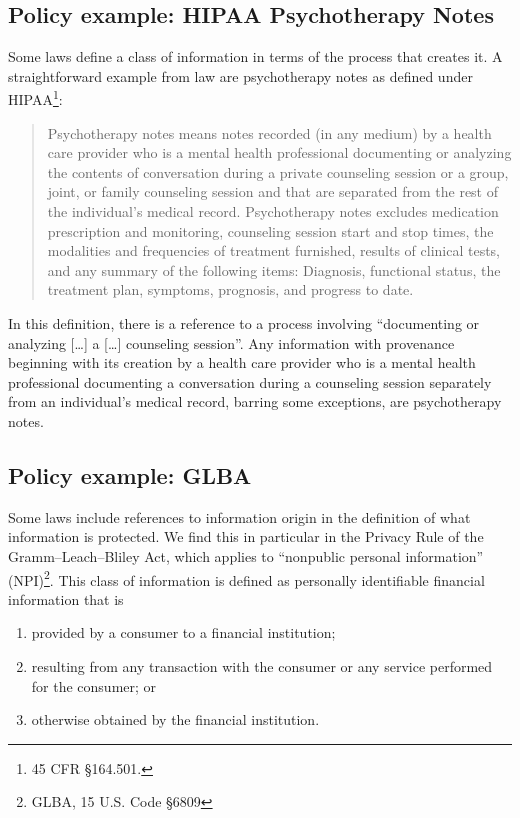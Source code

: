 \documentclass[../thesis.tex]{subfiles}
\begin{document}
\subsection{Policy example: HIPAA Psychotherapy Notes}
\label{sec:orgheadline3}

Some laws define a class of information in terms
of the process that creates it.
A straightforward example from law are psychotherapy notes
as defined under HIPAA\footnote{45 CFR \S 164.501.}:

\begin{quote}
Psychotherapy notes means notes recorded (in any medium) by a health care provider 
who is a mental health professional documenting or analyzing the contents of 
conversation during a private counseling session or a group, joint, or family 
counseling session and that are separated from the rest of the individual's 
medical record. Psychotherapy notes excludes medication prescription and 
monitoring, counseling session start and stop times, the modalities and 
frequencies of treatment furnished, results of clinical tests, and any 
summary of the following items: Diagnosis, functional status, 
the treatment plan, symptoms, prognosis, and progress to date.
\end{quote}

In this definition, there is a reference to a process involving 
``documenting or analyzing [\ldots] a [\ldots] counseling session''.
Any information with provenance beginning with its creation by a health 
care provider who is a mental health professional documenting a conversation 
during a counseling session separately from an individual's medical record, 
barring some exceptions, are psychotherapy notes.

\subsection{Policy example: GLBA}
\label{sec:orgheadline4}

Some laws include references to information origin in the 
definition of what information is protected. 
We find this in particular in the Privacy Rule of 
the Gramm--Leach--Bliley Act, which applies to 
``nonpublic personal information'' (NPI)\footnote{GLBA, 15 U.S. Code \S 6809}. 
This class of information is defined as personally identifiable
financial information that is
\begin{enumerate}
\item provided by a consumer to a financial institution;
\item resulting from any transaction with the consumer
  or any service performed for the consumer; or
\item otherwise obtained by the financial institution.
\end{enumerate}
\end{document}
